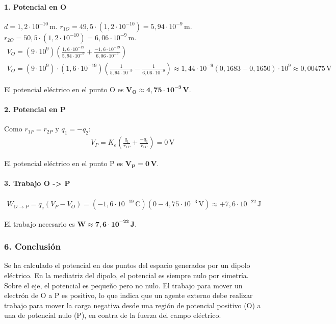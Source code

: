 \paragraph{1. Potencial en O}
$d = 1,2 \cdot 10^{-10} \, \text{m}$.
$r_{1O} = 49,5 \cdot (1,2 \cdot 10^{-10}) = 5,94 \cdot 10^{-9} \, \text{m}$.
$r_{2O} = 50,5 \cdot (1,2 \cdot 10^{-10}) = 6,06 \cdot 10^{-9} \, \text{m}$.
\begin{gather}
    V_O = (9 \cdot 10^9) \left( \frac{1,6 \cdot 10^{-19}}{5,94 \cdot 10^{-9}} + \frac{-1,6 \cdot 10^{-19}}{6,06 \cdot 10^{-9}} \right) \\
    V_O = (9 \cdot 10^9) \cdot (1,6 \cdot 10^{-19}) \left( \frac{1}{5,94 \cdot 10^{-9}} - \frac{1}{6,06 \cdot 10^{-9}} \right) \approx 1,44 \cdot 10^{-9} (0,1683 - 0,1650) \cdot 10^9 \approx 0,00475 \, \text{V}
\end{gather}
\begin{cajaresultado}
El potencial eléctrico en el punto O es $\boldsymbol{V_O \approx 4,75 \cdot 10^{-3} \, V}$.
\end{cajaresultado}

\paragraph{2. Potencial en P}
Como $r_{1P} = r_{2P}$ y $q_1 = -q_2$:
\begin{gather}
    V_P = K_e \left( \frac{q_1}{r_{1P}} + \frac{-q_1}{r_{1P}} \right) = 0 \, \text{V}
\end{gather}
\begin{cajaresultado}
El potencial eléctrico en el punto P es $\boldsymbol{V_P = 0 \, V}$.
\end{cajaresultado}

\paragraph{3. Trabajo O -> P}
\begin{gather}
    W_{O \to P} = q_e(V_P - V_O) = (-1,6 \cdot 10^{-19} \, \text{C}) (0 - 4,75 \cdot 10^{-3} \, \text{V}) \approx +7,6 \cdot 10^{-22} \, \text{J}
\end{gather}
\begin{cajaresultado}
El trabajo necesario es $\boldsymbol{W \approx 7,6 \cdot 10^{-22} \, J}$.
\end{cajaresultado}

\subsubsection*{6. Conclusión}
\begin{cajaconclusion}
Se ha calculado el potencial en dos puntos del espacio generados por un dipolo eléctrico. En la mediatriz del dipolo, el potencial es siempre nulo por simetría. Sobre el eje, el potencial es pequeño pero no nulo. El trabajo para mover un electrón de O a P es positivo, lo que indica que un agente externo debe realizar trabajo para mover la carga negativa desde una región de potencial positivo (O) a una de potencial nulo (P), en contra de la fuerza del campo eléctrico.
\end{cajaconclusion}


